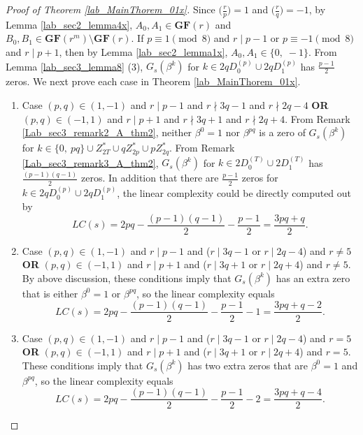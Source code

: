 \documentclass{mcom-l}
\theoremstyle{definition}
\numberwithin{equation}{section}
\begin{document}
     \begin{proof}[Proof of Theorem \ref{lab_MainThorem_01x}]
     Since $ \bigl(\tfrac{r}{p}\bigr) =1 $ and $ \bigl(\tfrac{r}{q}\bigr) =-1 $, by Lemma \ref{lab_sec2_lemma4x}, $ A_{0}, A_{1}\in \mathbf{GF}(r)$ and $ B_{0}, B_{1}\in \mathbf{GF}(r^{m})\setminus \mathbf{GF}(r)$. If $ p\equiv 1 \pmod  8 $ and $ r\mid p-1 $ or $ p\equiv -1 \pmod  8 $ and $ r\mid p+1 $, then by Lemma \ref{lab_sec2_lemma1x}, $ A_{0}, A_{1}\in \lbrace 0,\;-1\rbrace $. From Lemma \ref{lab_sec3_lemma8} (3), $ G_{s}(\beta^{k}) $ for $ k\in 2qD_{0}^{(p)}\cup 2qD_{1}^{(p)} $ has $ \tfrac{p-1}{2} $ zeros. We next prove each case in Theorem \ref{lab_MainThorem_01x}.
     \begin{enumerate}
     \item Case $ (p,q)\in (1,-1) $ and $ r\mid p-1 $ and $ r\nmid 3q-1 $ and $ r\nmid 2q-4 $ \textbf{OR} $ (p,q)\in (-1,1) $ and $ r\mid p+1 $ and $ r\nmid 3q+1 $ and $ r\nmid 2q+4 $. From Remark \ref{Lab_sec3_remark2_A_thm2}, neither $ \beta^{0}=1 $ nor $ \beta^{pq} $ is a zero of $ G_{s}(\beta^{k}) $ for $ k\in \lbrace 0,\ pq \rbrace \cup Z^{*}_{2T}\cup qZ^{*}_{2p}\cup pZ^{*}_{2q} $. From Remark \ref{Lab_sec3_remark3_A_thm2}, $ G_{s}(\beta^{k}) $ for $ k\in 2D_{0}^{(T)}\cup 2D_{1}^{(T)} $ has $ \tfrac{(p-1)(q-1)}{2} $ zeros. In addition that there are $ \tfrac{p-1}{2} $ zeros for $ k\in 2qD_{0}^{(p)}\cup 2qD_{1}^{(p)} $, the linear complexity could be directly computed out by 
     \begin{equation*}
     LC(s)=2pq-\frac{(p-1)(q-1)}{2}-\frac{p-1}{2}=\frac{3pq+q}{2}.
     \end{equation*}
     \item Case $ (p,q)\in (1,-1) $ and $ r\mid p-1 $ and ($ r\mid 3q-1 $ or $ r\mid 2q-4 $) and $ r\ne 5$ \textbf{OR} $ (p,q)\in (-1,1) $ and $ r\mid p+1 $ and ($ r\mid 3q+1 $ or $ r\mid 2q+4 $) and $ r\ne 5$. By above discussion, these conditions imply that $ G_{s}(\beta^{k}) $ has an extra zero that is either $ \beta^{0}=1 $ or $ \beta^{pq} $, so the linear complexity equals
        \begin{equation*}
        LC(s)=2pq-\frac{(p-1)(q-1)}{2}-\frac{p-1}{2}-1=\frac{3pq+q-2}{2}.
        \end{equation*}
     \item Case $ (p,q)\in (1,-1) $ and $ r\mid p-1 $ and ($ r\mid 3q-1 $ or $ r\mid 2q-4 $) and $ r= 5$ \textbf{OR} $ (p,q)\in (-1,1) $ and $ r\mid p+1 $ and ($ r\mid 3q+1 $ or $ r\mid 2q+4 $) and $ r= 5$. These conditions imply that $ G_{s}(\beta^{k}) $ has two extra zeros that are  $ \beta^{0}=1 $ and $ \beta^{pq} $, so the linear complexity equals
           \begin{equation*}
           LC(s)=2pq-\frac{(p-1)(q-1)}{2}-\frac{p-1}{2}-2=\frac{3pq+q-4}{2}.
           \end{equation*}
     \end{enumerate}
     \end{proof}
     
\end{document}
